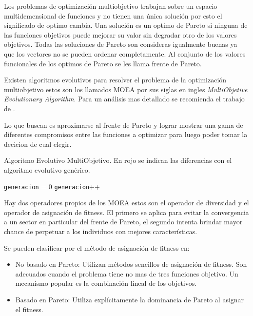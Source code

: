 Los problemas de optimización multiobjetivo trabajan sobre un espacio multidemensional de funciones y no tienen una única solución por esto el significado de optimo cambia. Una solución es un optimo de Pareto si ninguna de las funciones objetivos puede mejorar su valor sin degradar otro de los valores objetivos. Todas las soluciones de Pareto son consideras igualmente buenas ya que los vectores no se pueden ordenar completamente. Al conjunto de los valores funcionales de los optimos de Pareto se les llama frente de Pareto.

Existen algoritmos evolutivos para resolver el problema de la optimización multiobjetivo estos son los llamados MOEA por sus siglas en ingles \emph{ MultiObjetive Evolutionary Algorithm}. Para un análisis mas detallado se recomienda el trabajo de \citet{Deb2001}.

Lo que buscan es aproximarse al frente de Pareto y lograr mostrar una gama de diferentes compromisos entre las funciones a optimizar para luego poder tomar la decicion de cual elegir.


\begin{algorithm}%
	\caption{Algoritmo Evolutivo MultiObjetivo. En rojo se indican las diferencias con el algoritmo evolutivo genérico.}
	\label{alg:algoritmo_genetico_multiobjetivo}
	\begin{algorithmic} [1] 
		{
			\STATE \texttt{generacion} = 0
			\STATE {\textcolor{red}{Operador Diversidad (Pob(generacion))}}
			\STATE {\textcolor{red}{Asignar Fitness (Pob(generacion))}}
			\STATE \texttt{generacion}++
			\ENDWHILE
			\RETURN 	{\textcolor{red}{Frente de Pareto}}
		}
	\end{algorithmic}
\end{algorithm}

Hay dos operadores propios de los MOEA estos son el operador de diversidad y el operador de asignación de fitness. El primero se aplica para evitar la convergencia a un sector en particular del frente de Pareto, el segundo intenta brindar mayor chance de perpetuar a los individuos con mejores características.

Se pueden clasificar por el método de asignación de fitness en:
\begin{itemize}
	\item No basado en Pareto: Utilizan métodos sencillos de asignación de fitness. Son adecuados cuando el problema tiene no mas de tres funciones objetivo. Un mecanismo popular es la combinación lineal de los objetivos.
	\item Basado en Pareto: Utiliza explícitamente la dominancia de Pareto al asignar el fitness.
\end{itemize}



